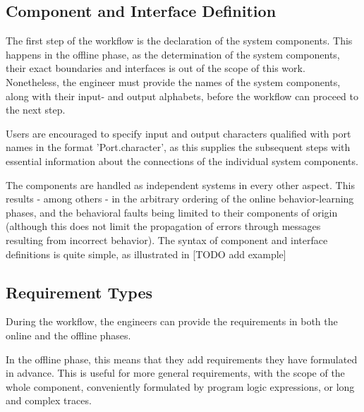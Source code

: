 \subsection{Component and Interface Definition} \label{subs_compdef}
The first step of the workflow is the declaration of the system components. This happens in the offline phase, as the determination of the system components, their exact boundaries and interfaces is out of the scope of this work. Nonetheless, the engineer must provide the names of the system components, along with their input- and output alphabets, before the workflow can proceed to the next step.

Users are encouraged to specify input and output characters qualified with port names in the format 'Port.character', as this supplies the subsequent steps with essential information about the connections of the individual system components.

The components are handled as independent systems in every other aspect. This results - among others - in the arbitrary ordering of the online behavior-learning phases, and the behavioral faults being limited to their components of origin (although this does not limit the propagation of errors through messages resulting from incorrect behavior).
The syntax of component and interface definitions is quite simple, as illustrated in [TODO add example]

\subsection{Requirement Types} \label{subs_reqtypes}
During the workflow, the engineers can provide the requirements in both the online and the offline phases. 

In the offline phase, this means that they add requirements they have formulated in advance. This is useful for more general requirements, with the scope of the whole component, conveniently formulated by program logic expressions, or long and complex traces.

